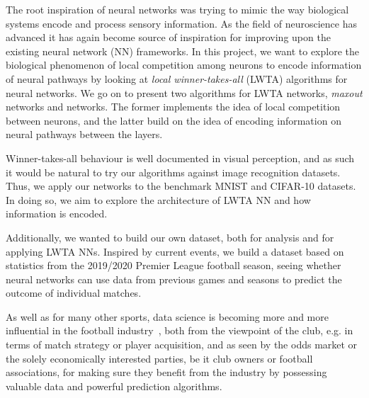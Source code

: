 The root inspiration of neural networks was trying to mimic the way biological systems encode and process sensory information. As the field of neuroscience has advanced it has again become source of inspiration for improving upon the existing neural network (NN) frameworks. In this project, we want to explore the biological phenomenon of local competition among neurons to encode information of neural pathways by looking at \textit{local winner-takes-all} (LWTA) algorithms for neural networks. We go on to present two algorithms for LWTA networks, \textit{maxout} networks and  networks. The former implements the idea of local competition between neurons, and the latter build on the idea of encoding information on neural pathways between the layers.

Winner-takes-all behaviour is well documented in visual perception, and as such it would be natural to try our algorithms against image recognition datasets. Thus, we apply our networks to the benchmark MNIST and CIFAR-10 datasets. In doing so, we aim to explore the architecture of LWTA NN and how information is encoded.

Additionally, we wanted to build our own dataset, both for analysis and for applying LWTA NNs. Inspired by current events, we build a dataset based on statistics from the 2019/2020 Premier League football season, seeing whether neural networks can use data from previous games and seasons to predict the outcome of individual matches.

As well as for many other sports, data science is becoming more and more influential in the football industry~\citep{Herbinet2018}, both from the viewpoint of the club, e.g. in terms of match strategy or player acquisition, and as seen by the odds market or the solely economically interested parties, be it club owners or football associations, for making sure they benefit from the industry by possessing valuable data and powerful prediction algorithms.

